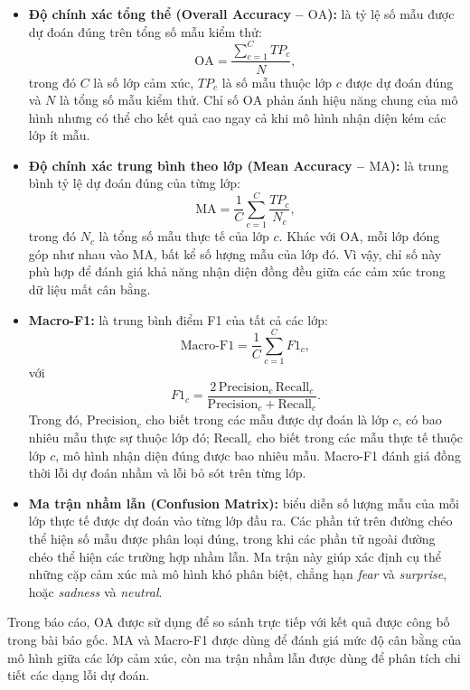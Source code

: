 \begin{itemize}
\item \textbf{Độ chính xác tổng thể (Overall Accuracy -- $\mathrm{OA}$):} là tỷ lệ số mẫu được dự đoán đúng trên tổng số mẫu kiểm thử:
\[
\mathrm{OA}
=
\frac{\sum_{c=1}^{C} TP_c}{N},
\]
trong đó $C$ là số lớp cảm xúc, $TP_c$ là số mẫu thuộc lớp $c$ được dự đoán đúng và $N$ là tổng số mẫu kiểm thử. Chỉ số $\mathrm{OA}$ phản ánh hiệu năng chung của mô hình nhưng có thể cho kết quả cao ngay cả khi mô hình nhận diện kém các lớp ít mẫu.


\item \textbf{Độ chính xác trung bình theo lớp (Mean Accuracy -- $\mathrm{MA}$):} là trung bình tỷ lệ dự đoán đúng của từng lớp:
\[
    \mathrm{MA}
    =
    \frac{1}{C}
    \sum_{c=1}^{C}
    \frac{TP_c}{N_c},
\]
trong đó $N_c$ là tổng số mẫu thực tế của lớp $c$. Khác với $\mathrm{OA}$, mỗi lớp đóng góp như nhau vào $\mathrm{MA}$, bất kể số lượng mẫu của lớp đó. Vì vậy, chỉ số này phù hợp để đánh giá khả năng nhận diện đồng đều giữa các cảm xúc trong dữ liệu mất cân bằng.

\item \textbf{Macro-F1:} là trung bình điểm F1 của tất cả các lớp:
\[
    \mathrm{Macro\text{-}F1}
    =
    \frac{1}{C}
    \sum_{c=1}^{C} F1_c,
\]
với
\[
    F1_c
    =
    \frac{2\,\mathrm{Precision}_c\,\mathrm{Recall}_c}
    {\mathrm{Precision}_c+\mathrm{Recall}_c}.
\]
Trong đó, $\mathrm{Precision}_c$ cho biết trong các mẫu được dự đoán là lớp $c$, có bao nhiêu mẫu thực sự thuộc lớp đó; $\mathrm{Recall}_c$ cho biết trong các mẫu thực tế thuộc lớp $c$, mô hình nhận diện đúng được bao nhiêu mẫu. Macro-F1 đánh giá đồng thời lỗi dự đoán nhầm và lỗi bỏ sót trên từng lớp.

\item \textbf{Ma trận nhầm lẫn (Confusion Matrix):} biểu diễn số lượng mẫu của mỗi lớp thực tế được dự đoán vào từng lớp đầu ra. Các phần tử trên đường chéo thể hiện số mẫu được phân loại đúng, trong khi các phần tử ngoài đường chéo thể hiện các trường hợp nhầm lẫn. Ma trận này giúp xác định cụ thể những cặp cảm xúc mà mô hình khó phân biệt, chẳng hạn \textit{fear} và \textit{surprise}, hoặc \textit{sadness} và \textit{neutral}.

\end{itemize}

Trong báo cáo, $\mathrm{OA}$ được sử dụng để so sánh trực tiếp với kết quả được công bố trong bài báo gốc. $\mathrm{MA}$ và Macro-F1 được dùng để đánh giá mức độ cân bằng của mô hình giữa các lớp cảm xúc, còn ma trận nhầm lẫn được dùng để phân tích chi tiết các dạng lỗi dự đoán.

